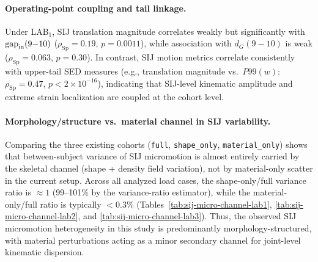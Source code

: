 \documentclass[11pt]{article}
\newcommand{\StdTableFont}{\footnotesize}
\newcommand{\StdTableInput}[1]{%
  \begingroup
  \setlength{\tabcolsep}{4pt}%
  \resizebox{\linewidth}{!}{}%
  \endgroup
}
\begin{document}
\paragraph{Operating-point coupling and tail linkage.}
Under LAB$_1$, SIJ translation magnitude correlates weakly but significantly with $\mathrm{gap}_{\rm in}(9{-}10)$ ($\rho_{\mathrm{Sp}}=0.19$, $p=0.0011$), while association with $d_G(9{-}10)$ is weak ($\rho_{\mathrm{Sp}}=0.063$, $p=0.30$).
In contrast, SIJ motion metrics correlate consistently with upper-tail SED measures (e.g., translation magnitude vs.\ $P99(w)$: $\rho_{\mathrm{Sp}}=0.47$, $p<2\times10^{-16}$), indicating that SIJ-level kinematic amplitude and extreme strain localization are coupled at the cohort level.

\paragraph{Morphology/structure vs.\ material channel in SIJ variability.}
Comparing the three existing cohorts (\texttt{full}, \texttt{shape\_only}, \texttt{material\_only}) shows that between-subject variance of SIJ micromotion is almost entirely carried by the skeletal channel (shape + density field variation), not by material-only scatter in the current setup.
Across all analyzed load cases, the shape-only/full variance ratio is $\approx 1$ (99--101\% by the variance-ratio estimator), while the material-only/full ratio is typically $<0.3\%$ (Tables~\ref{tab:sij-micro-channel-lab1}, \ref{tab:sij-micro-channel-lab2}, and \ref{tab:sij-micro-channel-lab3}).
Thus, the observed SIJ micromotion heterogeneity in this study is predominantly morphology-structured, with material perturbations acting as a minor secondary channel for joint-level kinematic dispersion.

\begin{table}[!tbp]
\centering
\caption{Variance-channel decomposition of SIJ micromotion under LAB\textsubscript{1}.  Ratios are computed as sample-variance ratios; values slightly above 100\% reflect finite-sample and numerical estimation noise and should be interpreted as $\approx$100\%.}
\label{tab:sij-micro-channel-lab1}
\StdTableFont
\StdTableInput{../../analysis_outputs/sij_micromotion/sij_micromotion_variance_channels_LAB_phase1.tex}
\end{table}

\begin{table}[!tbp]
\centering
\caption{Variance-channel decomposition of SIJ micromotion under LAB\textsubscript{2}.}
\label{tab:sij-micro-channel-lab2}
\StdTableFont
\StdTableInput{../../analysis_outputs/sij_micromotion/sij_micromotion_variance_channels_LAB_phase2.tex}
\end{table}
\end{document}
